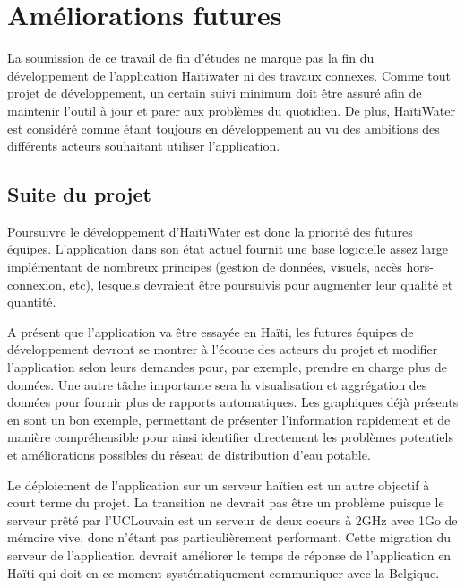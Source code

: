 \documentclass{EPL-master-thesis-covers-FR}
\begin{document}
	\chapter{Améliorations futures}

		La soumission de ce travail de fin d'études ne marque pas la fin du développement de l'application Haïtiwater ni des travaux connexes. Comme tout projet de développement, un certain suivi minimum doit être assuré afin de maintenir l'outil à jour et parer aux problèmes du quotidien. De plus, HaïtiWater est considéré comme étant toujours en développement au vu des ambitions des différents acteurs souhaitant utiliser l'application.

		\section{Suite du projet}
			\label{ref:suite_projet}

			Poursuivre le développement d'HaïtiWater est donc la priorité des futures équipes. L'application dans son état actuel fournit une base logicielle assez large implémentant de nombreux principes (gestion de données, visuels, accès hors-connexion, etc), lesquels devraient être poursuivis pour augmenter leur qualité et quantité.

			A présent que l'application va être essayée en Haïti, les futures équipes de développement devront se montrer à l'écoute des acteurs du projet et modifier l'application selon leurs demandes pour, par exemple, prendre en charge plus de données. Une autre tâche importante sera la visualisation et aggrégation des données pour fournir plus de rapports automatiques. Les graphiques déjà présents en sont un bon exemple, permettant de présenter l'information rapidement et de manière compréhensible pour ainsi identifier directement les problèmes potentiels et améliorations possibles du réseau de distribution d'eau potable.

			Le déploiement de l'application sur un serveur haïtien est un autre objectif à court terme du projet. La transition ne devrait pas être un problème puisque le serveur prêté par l'UCLouvain est un serveur de deux coeurs à 2GHz avec 1Go de mémoire vive, donc n'étant pas particulièrement performant. Cette migration du serveur de l'application devrait améliorer le temps de réponse de l'application en Haïti qui doit en ce moment systématiquement communiquer avec la Belgique.
\end{document}
